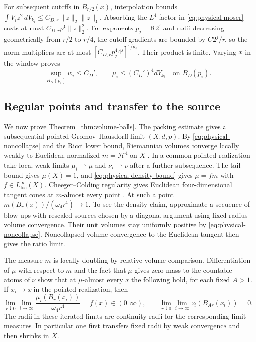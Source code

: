 For subsequent cutoffs in \(B_{r/2}(x)\), interpolation bounds
\(\int V_i z^2\,dV_{k_i}\leq C_{D,r}\|z\|_2\|z\|_4\).
Absorbing the \(L^4\) factor in \eqref{eq:physical-moser} costs
at most \(C_{D,r}p^4\|z\|_2^2\). For exponents \(p_j=8\,2^j\)
and radii decreasing geometrically from \(r/2\) to \(r/4\),
the cutoff gradients are bounded by \(C2^j/r\), so the norm
multipliers are at most \([C_{D,r}p_j^4 4^j]^{1/p_j}\). Their
product is finite. Varying \(x\) in the window proves
\begin{equation}\label{eq:physical-density-bound}
 \sup_{B_D(p_i)}w_i\leq C_D',\qquad
 \mu_i\leq (C_D')^4 dV_{k_i}\quad\text{on } B_D(p_i).
\end{equation}

\subsection{Regular points and transfer to the source}

We now prove Theorem~\ref{thm:volume-balls}. The packing estimate
gives a subsequential pointed Gromov--Hausdorff limit \((X,d,p)\).
By \eqref{eq:physical-noncollapse} and the Ricci lower bound,
Riemannian volumes converge locally weakly to Euclidean-normalized
\(m=\mathcal H^4\) on \(X\)
\cite[Theorem~5.9]{CheegerColding1997StructureI}. In a common pointed
realization take local weak limits \(\mu_i\rightharpoonup\mu\) and
\(\nu_i\rightharpoonup\nu\) after a further subsequence. The tail
bound gives \(\mu(X)=1\), and \eqref{eq:physical-density-bound}
gives \(\mu=fm\) with \(f\in L^\infty_{\mathrm{loc}}(X)\).
Cheeger--Colding regularity gives Euclidean four-dimensional tangent
cones at \(m\)-almost every point
\cite[Theorems~2.1 and 5.11]{CheegerColding1997StructureI}.
At such a point \(m(B_r(x))/(\omega_4r^4)\to1\). To see the density
claim, approximate a sequence of blow-ups with rescaled sources
chosen by a diagonal argument using fixed-radius volume convergence.
Their unit volumes stay uniformly positive by
\eqref{eq:physical-noncollapse}. Noncollapsed volume convergence
to the Euclidean tangent then gives the ratio limit.

The measure \(m\) is locally doubling by relative volume comparison.
Differentiation of \(\mu\) with respect to \(m\) and the fact that
\(\mu\) gives zero mass to the countable atoms of \(\nu\) show that
at \(\mu\)-almost every \(x\) the following hold, for each fixed \(A>1\).
If \(x_i\to x\) in the pointed realization, then
\begin{equation}\label{eq:physical-ordered-limits}
 \lim_{r\downarrow0}\lim_{i\to\infty}
      \frac{\mu_i(B_r(x_i))}{\omega_4 r^4}=f(x)\in(0,\infty),
 \qquad
 \lim_{r\downarrow0}\lim_{i\to\infty}\nu_i(B_{Ar}(x_i))=0.
\end{equation}
The radii in these iterated limits are continuity radii for the
corresponding limit measures. In particular one first transfers
fixed radii by weak convergence and then shrinks in \(X\).

